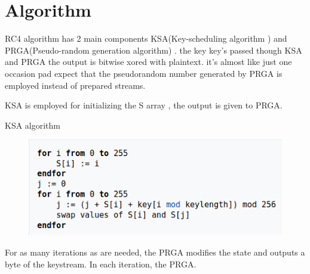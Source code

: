 \documentclass[conference]{IEEEtran}
\begin{document}
\section{Algorithm}
RC4 algorithm has 2 main components KSA(Key-scheduling algorithm ) and PRGA(Pseudo-random generation algorithm) . the key key's passed though KSA and PRGA the output is bitwise xored with plaintext. it's almost like just one occasion pad expect that the pseudorandom number generated by PRGA is employed instead of prepared streams.



KSA is employed for initializing the S array , the output is given to PRGA.
\newline 
\newline 
\newline
\newline \newline \newline 
\newline 
\newline 
\centerline{KSA algorithm}

\begin{figure}[H]
    \centering
    \includegraphics[width=\linewidth]{ksa}
\end{figure}





For as many iterations as are needed, the PRGA modifies the state and outputs a byte of the keystream. In each iteration, the PRGA. \newline \newline
\end{document}

